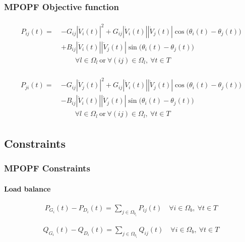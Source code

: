 \documentclass[
	11pt, %
	aspectratio=169, %
]{beamer}
\begin{document}

\begin{frame}
    \frametitle{MPOPF Objective function}

    \begin{align}
    \label{eq:Mexpr_p_flow_ij}
        \begin{split}
        P_{ij}(t) =\ &-G_{ij} \left|\dot{V}_{i}(t)\right|^2 
        + G_{ij} \left|\dot{V}_{i}(t)\right|\left|\dot{V}_{j}(t)\right| \cos\big(\theta_{i}(t)-\theta_{j}(t)\big) \\
        &+ B_{ij} \left|\dot{V}_{i}(t)\right|\left|\dot{V}_{j}(t)\right| \sin\big(\theta_{i}(t)-\theta_{j}(t)\big) \\[1em]
        &\qquad \forall l \in \Omega_{l} \ \text{or} \ \forall (ij) \in \Omega_{l},\ \forall t \in T
        \end{split}
    \end{align}

    \begin{align}
    \label{eq:Mexpr_p_flow_ji}
        \begin{split}
        P_{ji}(t) =\ &-G_{ij} \left|\dot{V}_{j}(t)\right|^2 
        + G_{ij} \left|\dot{V}_{i}(t)\right|\left|\dot{V}_{j}(t)\right| \cos\big(\theta_{i}(t)-\theta_{j}(t)\big) \\
        &- B_{ij} \left|\dot{V}_{i}(t)\right|\left|\dot{V}_{j}(t)\right| \sin\big(\theta_{i}(t)-\theta_{j}(t)\big) \\[1em]
        &\qquad \forall l \in \Omega_{l} \ \text{or} \ \forall (ij) \in \Omega_{l},\ \forall t \in T
        \end{split}
    \end{align}

\end{frame}


\subsection{Constraints}

\begin{frame}
    \frametitle{MPOPF Constraints}
    \label{frame:MPOFP_constraints}
    \framesubtitle{Load balance} %

    \begin{align}
    \label{eq:Mcons_load_bal_P}
        P_{G_{i}}(t) - P_{D_{i}}(t) = \sum_{j \in \Omega_{b_{i}}} P_{ij}(t)  \quad \forall i \in \Omega_{b},\ \forall t \in T
    \end{align}

    \begin{align}
    \label{eq:Mcons_load_bal_Q}
        Q_{G_{i}}(t) - Q_{D_{i}}(t) = \sum_{j \in \Omega_{b_{i}}} Q_{ij}(t)  \quad \forall i \in \Omega_{b},\ \forall t \in T
    \end{align}

\end{frame}
\end{document}
